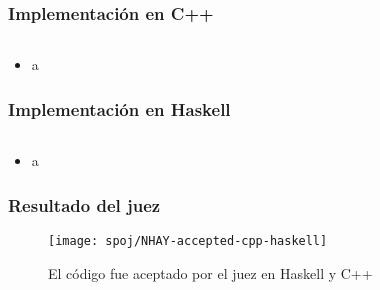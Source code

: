 

\subsubsection{Implementación en C++}
\inputminted[linenos, frame=lines]{cpp}{problemas/cpp/NHAY.cpp}

\begin{itemize}
\item a
\end{itemize}

\subsubsection{Implementación en Haskell}
\inputminted[linenos, frame=lines]{haskell}{problemas/haskell/NHAY.hs}

\begin{itemize}
\item a
\end{itemize}

\subsubsection{Resultado del juez}
\begin{figure}[h]
\centering
\texttt{[image: spoj/NHAY-accepted-cpp-haskell]}
\caption{El código fue aceptado por el juez en Haskell y C++}
\end{figure}



